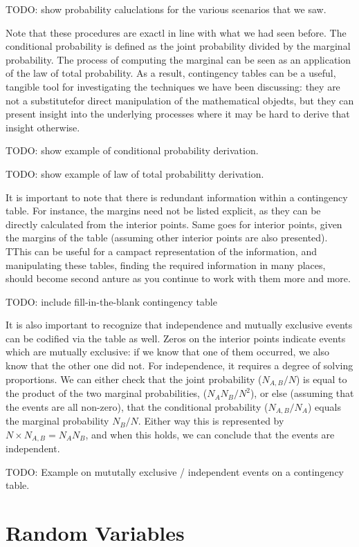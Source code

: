 \documentclass[
  letterpaper,
  DIV=11,
  numbers=noendperiod]{scrreprt}
\begin{document}
TODO: show probability caluclations for the various scenarios that we
saw.

Note that these procedures are exactl in line with what we had seen
before. The conditional probability is defined as the joint probability
divided by the marginal probability. The process of computing the
marginal can be seen as an application of the law of total probability.
As a result, contingency tables can be a useful, tangible tool for
investigating the techniques we have been discussing: they are not a
substitutefor direct manipulation of the mathematical objedts, but they
can present insight into the underlying processes where it may be hard
to derive that insight otherwise.

TODO: show example of conditional probability derivation.

TODO: show example of law of total probabilitty derivation.

It is important to note that there is redundant information within a
contingency table. For instance, the margins need not be listed
explicit, as they can be directly calculated from the interior points.
Same goes for interior points, given the margins of the table (assuming
other interior points are also presented). TThis can be useful for a
campact representation of the information, and manipulating these
tables, finding the required information in many places, should become
second anture as you continue to work with them more and more.

TODO: include fill-in-the-blank contingency table

It is also important to recognize that independence and mutually
exclusive events can be codified via the table as well. Zeros on the
interior points indicate events which are mutually exclusive: if we know
that one of them occurred, we also know that the other one did not. For
independence, it requires a degree of solving proportions. We can either
check that the joint probability (\(N_{A,B}/N\)) is equal to the product
of the two marginal probabilities, (\(N_AN_B/N^2\)), or else (assuming
that the events are all non-zero), that the conditional probability
(\(N_{A,B}/N_A\)) equals the marginal probability \(N_B/N\). Either way
this is represented by \(N\times N_{A,B} = N_AN_B\), and when this
holds, we can conclude that the events are independent.

TODO: Example on mututally exclusive / independent events on a
contingency table.

\chapter{Random Variables}\label{random-variables}
\end{document}
